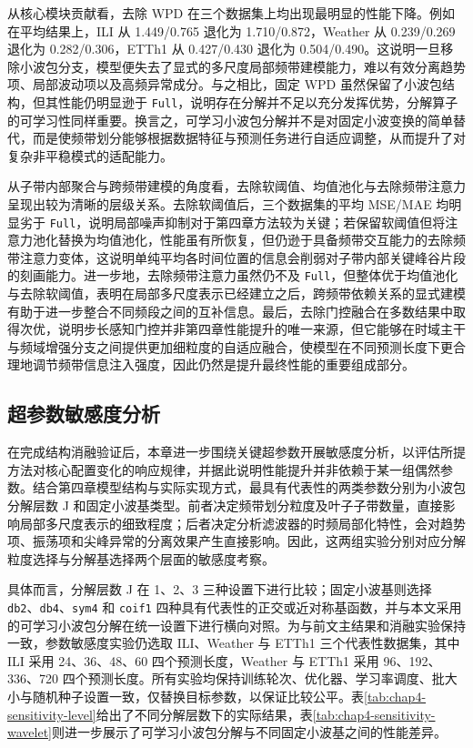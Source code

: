 从核心模块贡献看，去除 WPD 在三个数据集上均出现最明显的性能下降。例如在平均结果上，ILI 从 1.449/0.765 退化为 1.710/0.872，Weather 从 0.239/0.269 退化为 0.282/0.306，ETTh1 从 0.427/0.430 退化为 0.504/0.490。这说明一旦移除小波包分支，模型便失去了显式的多尺度局部频带建模能力，难以有效分离趋势项、局部波动项以及高频异常成分。与之相比，固定 WPD 虽然保留了小波包结构，但其性能仍明显逊于 \texttt{Full}，说明存在分解并不足以充分发挥优势，分解算子的可学习性同样重要。换言之，可学习小波包分解并不是对固定小波变换的简单替代，而是使频带划分能够根据数据特征与预测任务进行自适应调整，从而提升了对复杂非平稳模式的适配能力。

从子带内部聚合与跨频带建模的角度看，去除软阈值、均值池化与去除频带注意力呈现出较为清晰的层级关系。去除软阈值后，三个数据集的平均 MSE/MAE 均明显劣于 \texttt{Full}，说明局部噪声抑制对于第四章方法较为关键；若保留软阈值但将注意力池化替换为均值池化，性能虽有所恢复，但仍逊于具备频带交互能力的去除频带注意力变体，这说明单纯平均各时间位置的信息会削弱对子带内部关键峰谷片段的刻画能力。进一步地，去除频带注意力虽然仍不及 \texttt{Full}，但整体优于均值池化与去除软阈值，表明在局部多尺度表示已经建立之后，跨频带依赖关系的显式建模有助于进一步整合不同频段之间的互补信息。最后，去除门控融合在多数结果中取得次优，说明步长感知门控并非第四章性能提升的唯一来源，但它能够在时域主干与频域增强分支之间提供更加细粒度的自适应融合，使模型在不同预测长度下更合理地调节频带信息注入强度，因此仍然是提升最终性能的重要组成部分。

\subsection{超参数敏感度分析}
在完成结构消融验证后，本章进一步围绕关键超参数开展敏感度分析，以评估所提方法对核心配置变化的响应规律，并据此说明性能提升并非依赖于某一组偶然参数。结合第四章模型结构与实际实现方式，最具有代表性的两类参数分别为小波包分解层数 J 和固定小波基类型。前者决定频带划分粒度及叶子子带数量，直接影响局部多尺度表示的细致程度；后者决定分析滤波器的时频局部化特性，会对趋势项、振荡项和尖峰异常的分离效果产生直接影响。因此，这两组实验分别对应分解粒度选择与分解基选择两个层面的敏感度考察。

具体而言，分解层数 J 在 1、2、3 三种设置下进行比较；固定小波基则选择 \texttt{db2}、\texttt{db4}、\texttt{sym4} 和 \texttt{coif1} 四种具有代表性的正交或近对称基函数，并与本文采用的可学习小波包分解在统一设置下进行横向对照。为与前文主结果和消融实验保持一致，参数敏感度实验仍选取 ILI、Weather 与 ETTh1 三个代表性数据集，其中 ILI 采用 24、36、48、60 四个预测长度，Weather 与 ETTh1 采用 96、192、336、720 四个预测长度。所有实验均保持训练轮次、优化器、学习率调度、批大小与随机种子设置一致，仅替换目标参数，以保证比较公平。表\ref{tab:chap4-sensitivity-level}给出了不同分解层数下的实际结果，表\ref{tab:chap4-sensitivity-wavelet}则进一步展示了可学习小波包分解与不同固定小波基之间的性能差异。

